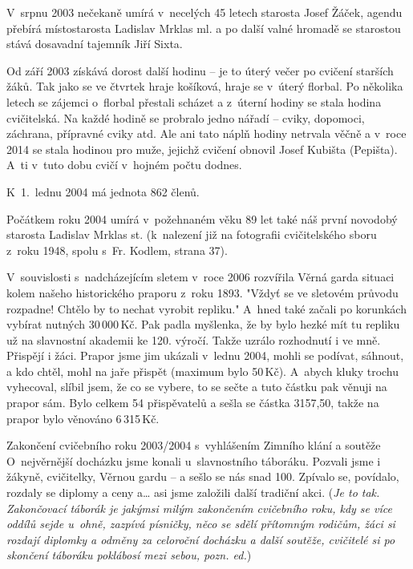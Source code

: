 \documentclass[a5paper, 11pt, twoside]{article}
\begin{document}
{\sloppy V~srpnu 2003 nečekaně umírá v~necelých 45 letech starosta Josef Žáček,
agendu přebírá místostarosta Ladislav Mrklas ml. a po další valné
hromadě se starostou stává dosavadní tajemník Jiří Sixta. \par}

Od září 2003 získává dorost další hodinu -- je to úterý večer po cvičení
starších žáků. Tak jako se ve čtvrtek hraje košíková, hraje se v~úterý
florbal. Po několika letech se zájemci o~florbal přestali scházet a
z~úterní hodiny se stala hodina cvičitelská. Na každé hodině se probralo
jedno nářadí -- cviky, dopomoci, záchrana, přípravné cviky atd. Ale ani
tato náplň hodiny netrvala věčně a v~roce 2014 se stala hodinou pro
muže, jejichž cvičení obnovil Josef Kubišta (Pepišta). A~ti v~tuto dobu
cvičí v~hojném počtu dodnes.

K~1.~lednu 2004 má jednota 862 členů.

Počátkem roku 2004 umírá v~požehnaném věku 89 let také náš první
novodobý starosta Ladislav Mrklas st. (k~nalezení již na fotografii
cvičitelského sboru z~roku 1948, spolu s~Fr. Kodlem, strana 37). %

V~souvislosti s~nadcházejícím sletem v~roce 2006 rozvířila Věrná garda
situaci kolem našeho historického praporu z~roku 1893. "Vždyť se ve
sletovém průvodu rozpadne! Chtělo by to nechat vyrobit repliku." A~hned
také začali po korunkách vybírat nutných 30\,000\,Kč. Pak padla myšlenka,
že by bylo hezké mít tu repliku už na slavnostní akademii ke 120.
výročí. Takže uzrálo rozhodnutí i ve mně. Přispějí i žáci. Prapor jsme
jim ukázali v~lednu 2004, mohli se podívat, sáhnout, a kdo chtěl, mohl
na jaře přispět (maximum bylo 50\,Kč). A~abych kluky trochu vyhecoval,
slíbil jsem, že co se vybere, to se sečte a tuto částku pak věnuji na
prapor sám. Bylo celkem 54 přispěvatelů a sešla se částka 3157,50, takže
na prapor bylo věnováno 6\,315\,Kč.

Zakončení cvičebního roku 2003/2004 s~vyhlášením Zimního klání a soutěže
O~nejvěrnější docházku jsme konali u~slavnostního táboráku. Pozvali jsme
i žákyně, cvičitelky, Věrnou gardu -- a sešlo se nás snad 100. Zpívalo
se, povídalo, rozdaly se diplomy a ceny a\ldots{} asi jsme založili další
tradiční akci. (\textit{Je to tak. Zakončovací táborák je jakýmsi milým
zakončením cvičebního roku, kdy se více oddílů sejde u~ohně, zazpívá
písničky, něco se sdělí přítomným rodičům, žáci si rozdají diplomky a
odměny za celoroční docházku a další soutěže, cvičitelé si po skončení
táboráku poklábosí mezi sebou, pozn. ed.})
\end{document}
